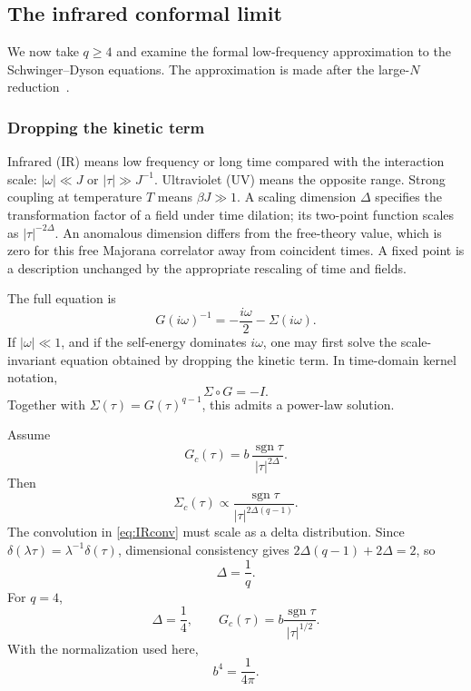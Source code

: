 \documentclass[11pt]{article}
\numberwithin{equation}{section}
\theoremstyle{exposition}
\theoremstyle{result}
\newcommand{\sgn}{\operatorname{sgn}}
\begin{document}
\subsection{The infrared conformal limit}

We now take $q\geq4$ and examine the formal low-frequency approximation to the Schwinger--Dyson equations. The approximation is made after the large-$N$ reduction~\cite{MaldacenaStanford}.

\subsubsection{Dropping the kinetic term}


Infrared (IR) means low frequency or long time compared with the interaction scale: $|\omega|\ll J$ or $|\tau|\gg J^{-1}$. Ultraviolet (UV) means the opposite range. Strong coupling at temperature $T$ means $\beta J\gg1$. A scaling dimension $\Delta$ specifies the transformation factor of a field under time dilation; its two-point function scales as $|\tau|^{-2\Delta}$. An anomalous dimension differs from the free-theory value, which is zero for this free Majorana correlator away from coincident times. A fixed point is a description unchanged by the appropriate rescaling of time and fields.

The full equation is
\begin{equation*}
G(i\omega)^{-1}=-\frac{i\omega}{2}-\Sigma(i\omega).
\end{equation*}
If $|\omega|\ll1$, and if the self-energy dominates $i\omega$, one may first solve the scale-invariant equation obtained by dropping the kinetic term. In time-domain kernel notation,
\begin{equation}
\Sigma\circ G=-I.
\label{eq:IRconv}
\end{equation}
Together with $\Sigma(\tau)=G(\tau)^{q-1}$, this admits a power-law solution.

Assume
\begin{equation*}
G_c(\tau)=b\,\frac{\sgn\tau}{|\tau|^{2\Delta}}.
\end{equation*}
Then
\begin{equation*}
\Sigma_c(\tau)\propto \frac{\sgn\tau}{|\tau|^{2\Delta(q-1)}}.
\end{equation*}
The convolution in \eqref{eq:IRconv} must scale as a delta distribution. Since $\delta(\lambda\tau)=\lambda^{-1}\delta(\tau)$, dimensional consistency gives $2\Delta(q-1)+2\Delta=2$, so
\begin{equation*}
\Delta=\frac1q.
\end{equation*}
For $q=4$,
\begin{equation}
\Delta=\frac14,
\qquad
G_c(\tau)=b\frac{\sgn\tau}{|\tau|^{1/2}}.
\label{eq:IRG}
\end{equation}
With the normalization used here,
\begin{equation*}
b^4=\frac1{4\pi}.
\end{equation*}
\end{document}

